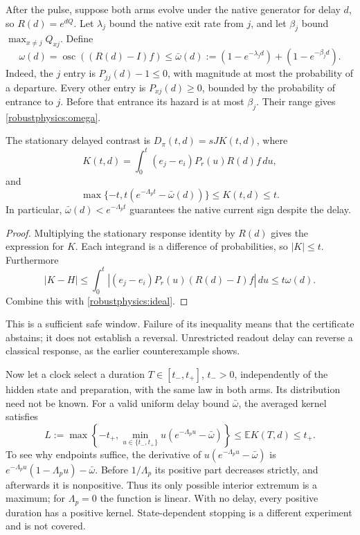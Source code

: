After the pulse, suppose both arms evolve under the native generator for
delay $d$, so $R(d)=e^{dQ}$. Let $\lambda_j$ bound the native exit rate from
$j$, and let $\beta_j$ bound $\max_{x\ne j}Q_{xj}$. Define
\begin{equation}\label{robustphysics:omega}
 \omega(d)=\operatorname{osc}((R(d)-I)f)
 \le\bar\omega(d):=(1-e^{-\lambda_j d})+(1-e^{-\beta_j d}).
\end{equation}
Indeed, the $j$ entry is $P_{jj}(d)-1\le0$, with magnitude at most the
probability of a departure. Every other entry is $P_{xj}(d)\ge0$, bounded
by the probability of entrance to $j$. Before that entrance its hazard is
at most $\beta_j$. Their range gives \eqref{robustphysics:omega}.

\begin{theorem}
\label{robustphysics:delay}
The stationary delayed contrast is $D_\pi(t,d)=sJK(t,d)$, where
\[
 K(t,d)=\int_0^t(e_j-e_i)P_r(u)R(d)f\,du,
\]
and
\[
 \max\{-t,t(e^{-\Lambda_p t}-\bar\omega(d))\}
 \le K(t,d)\le t.
\]
In particular, $\bar\omega(d)<e^{-\Lambda_p t}$ guarantees the native
current sign despite the delay.
\end{theorem}

\begin{proof}
Multiplying the stationary response identity by $R(d)$ gives the expression
for $K$. Each integrand is a difference of probabilities, so $|K|\le t$.
Furthermore
\[
 |K-H|\le\int_0^t
 |(e_j-e_i)P_r(u)(R(d)-I)f|\,du\le t\omega(d).
\]
Combine this with \eqref{robustphysics:ideal}.
\end{proof}

This is a sufficient safe window. Failure of its inequality means that the
certificate abstains; it does not establish a reversal. Unrestricted readout
delay can reverse a classical response, as the earlier counterexample shows.

Now let a clock select a duration $T\in[t_-,t_+]$, $t_->0$, independently
of the hidden state and preparation, with the same law in both arms. Its
distribution need not be known. For a valid uniform delay bound $\bar\omega$,
the averaged kernel satisfies
\begin{equation}\label{robustphysics:jitter}
 L:=\max\left\{-t_+,\min_{u\in\{t_-,t_+\}}
 u(e^{-\Lambda_pu}-\bar\omega)\right\}
 \le\mathbb E K(T,d)\le t_+.
\end{equation}
To see why endpoints suffice, the derivative of
$u(e^{-\Lambda_pu}-\bar\omega)$ is
$e^{-\Lambda_pu}(1-\Lambda_pu)-\bar\omega$. Before $1/\Lambda_p$ its
positive part decreases strictly, and afterwards it is nonpositive. Thus its
only possible interior extremum is a maximum; for $\Lambda_p=0$ the function
is linear. With no delay, every positive duration has a positive kernel.
State-dependent stopping is a different experiment and is not covered.

